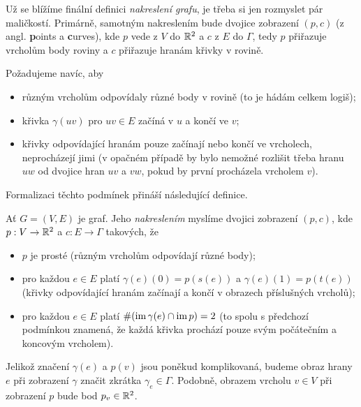 Už se blížíme finální definici \emph{nakreslení grafu}, je třeba si jen
rozmyslet pár maličkostí. Primárně, samotným nakreslením bude dvojice zobrazení
$(p,c)$ (z angl. \textbf{p}oints a \textbf{c}urves), kde $p$ vede z $V$ do
$\mathbb{R}^2$ a $c$ z $E$ do $\Gamma$, tedy $p$ přiřazuje vrcholům body roviny a $c$
přiřazuje hranám křivky v rovině.

Požadujeme navíc, aby
\begin{itemize}
 \item různým vrcholům odpovídaly různé body v rovině (to je hádám celkem
  logiš);
 \item křivka $\gamma(uv)$ pro $uv \in E$ začíná v $u$ a končí ve $v$; 
 \item křivky odpovídající hranám pouze začínají nebo končí ve vrcholech,
  neprocházejí jimi (v opačném případě by bylo nemožné rozlišit třeba hranu $uw$
  od dvojice hran $uv$ a $vw$, pokud by první procházela vrcholem $v$).
\end{itemize}

Formalizaci těchto podmínek přináší následující definice.
\begin{definition}
 \label{def:nakresleni-grafu}
 Ať $G = (V,E)$ je graf. Jeho \emph{nakreslením} myslíme dvojici zobrazení
 $(p,c)$, kde $p: V \to \mathbb{R}^2$ a $c: E \to \Gamma$ takových, že
 \begin{itemize}
  \item $p$ je prosté (různým vrcholům odpovídají různé body);
  \item pro každou $e \in E$ platí $\gamma(e)(0) = p(s(e))$ a $\gamma(e)(1) =
   p(t(e))$ (křivky odpovídající hranám začínají a končí v obrazech příslušných
   vrcholů);
  \item pro každou $e \in E$ platí $\# (\operatorname{im} \gamma(e) \cap \operatorname{im} p) = 2$ (to
   spolu s předchozí podmínkou znamená, že každá křivka prochází pouze svým
   počátečním a koncovým vrcholem).
 \end{itemize}
 Jelikož značení $\gamma(e)$ a $p(v)$ jsou poněkud komplikovaná, budeme obraz
 hrany $e$ při zobrazení $\gamma$ značit zkrátka $\gamma_e \in \Gamma$. Podobně,
 obrazem vrcholu $v \in V$ při zobrazení $p$ bude bod $p_v \in \mathbb{R}^2$.
\end{definition}



